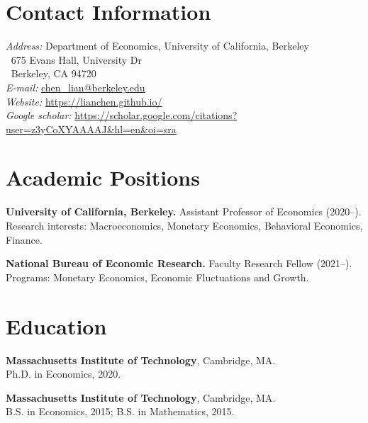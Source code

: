 \documentclass[line]{res}
\newenvironment{list1}{
  \begin{list}{\ding{113}}{%
      \setlength{\itemsep}{0.07in}
      \setlength{\parsep}{0in} \setlength{\parskip}{0in}
		\setlength{\topsep}{0.07in} \setlength{\partopsep}{0in} 
      \setlength{\leftmargin}{0.0in}}}{\end{list}}
\begin{document}
\renewcommand{\sc}{}

\begin{resume}
\section{\sc Contact Information}
\vspace{.05in}
{\it Address:} 
Department of Economics, University of California, Berkeley\\
$~$ \hspace{12mm}
675 Evans Hall, University Dr \\
$~$ \hspace{12mm} 
Berkeley, CA 94720
$~$ \hspace{12mm} \\
  {\it E-mail:} \url{chen_lian@berkeley.edu} \\       
  {\it Website:} \url{https://lianchen.github.io/} \\
  {\it Google scholar:} \url{https://scholar.google.com/citations?user=z3yCoXYAAAAJ&hl=en&oi=sra} 


\section{\sc Academic Positions}

\begin{list1}

\item[] 
\textbf{University of California, Berkeley.} Assistant Professor of Economics (2020--).\\
 Research interests: Macroeconomics, Monetary Economics, Behavioral Economics, Finance.
\vspace{0.2cm}
\item[]
\textbf{National Bureau of Economic Research.} Faculty Research Fellow (2021--). \\
 Programs: Monetary Economics, Economic Fluctuations and Growth.
\end{list1}
\section{\sc Education} 

\begin{list1}
\item[]
\textbf{Massachusetts Institute of Technology}, Cambridge, MA. \\
Ph.D. in Economics, 2020.
\vspace{0.2cm}
\item[]
\textbf{Massachusetts Institute of Technology}, Cambridge, MA.\\
B.S. in Economics, 2015; B.S. in Mathematics, 2015. 
\end{list1}


\end{resume}
\end{document}
